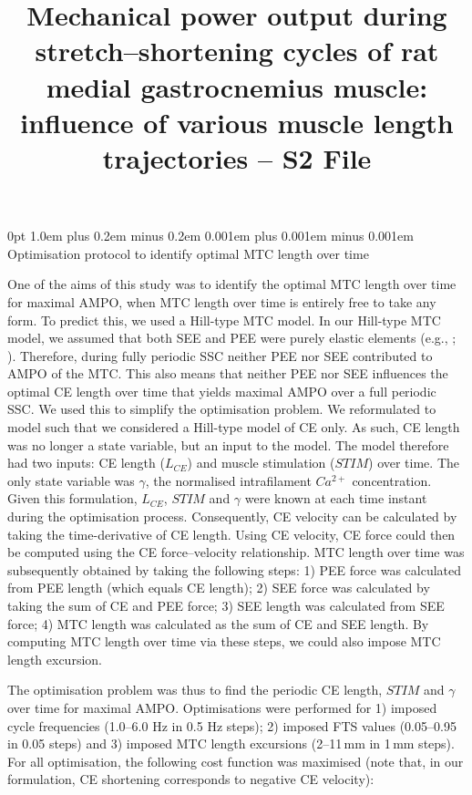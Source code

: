 \documentclass[
  11pt,
  a4paper]{article}
\title{Mechanical power output during stretch--shortening cycles of rat
medial gastrocnemius muscle: influence of various muscle length
trajectories -- S2 File}
\author{}
\date{}
\makeatletter
\renewcommand{\section}{%
  \@startsection{section}{1}
    {0pt} 					%
    {1.0em plus 0.2em minus 0.2em} 	%
    {0.001em plus 0.001em minus 0.001em}    	%
    {\Large\bfseries\sffamily}%
}
\newcommand*\quartosuppfigref[1]{Figure \hyperref[#1]{S\ref{#1}}}
\makeatother
\begin{document}
\linenumbers

\renewcommand{\thesection}{S\arabic{section}}
\setcounter{section}{1}
\renewcommand{\thesuppfig}{\thesection.\arabic{suppfig}}
\renewcommand*\quartosuppfigref[1]{Figure~\ref{#1}}


\section{Optimisation protocol to identify optimal MTC length over
time}\label{optimisation-protocol-to-identify-optimal-mtc-length-over-time}

One of the aims of this study was to identify the optimal MTC length
over time for maximal AMPO, when MTC length over time is entirely free
to take any form. To predict this, we used a Hill-type MTC model. In our
Hill-type MTC model, we assumed that both SEE and PEE were purely
elastic elements (e.g., ; ). Therefore, during fully periodic SSC neither PEE nor
SEE contributed to AMPO of the MTC. This also means that neither PEE nor
SEE influences the optimal CE length over time that yields maximal AMPO
over a full periodic SSC. We used this to simplify the optimisation
problem. We reformulated to model such that we considered a Hill-type
model of CE only. As such, CE length was no longer a state variable, but
an input to the model. The model therefore had two inputs: CE length
(\(L_{CE}\)) and muscle stimulation (\(STIM\)) over time. The only state
variable was \(\gamma\), the normalised intrafilament \(Ca^{2+}\)
concentration. Given this formulation, \(L_{CE}\), \(STIM\) and
\(\gamma\) were known at each time instant during the optimisation
process. Consequently, CE velocity can be calculated by taking the
time-derivative of CE length. Using CE velocity, CE force could then be
computed using the CE force--velocity relationship. MTC length over time
was subsequently obtained by taking the following steps: 1) PEE force
was calculated from PEE length (which equals CE length); 2) SEE force
was calculated by taking the sum of CE and PEE force; 3) SEE length was
calculated from SEE force; 4) MTC length was calculated as the sum of CE
and SEE length. By computing MTC length over time via these steps, we
could also impose MTC length excursion.

The optimisation problem was thus to find the periodic CE length,
\(STIM\) and \(\gamma\) over time for maximal AMPO. Optimisations were
performed for 1) imposed cycle frequencies (1.0--6.0 Hz in 0.5 Hz
steps); 2) imposed FTS values (0.05--0.95 in 0.05 steps) and 3) imposed
MTC length excursions (2--11\,mm in 1\,mm steps). For all optimisation,
the following cost function was maximised (note that, in our
formulation, CE shortening corresponds to negative CE velocity):
\end{document}
